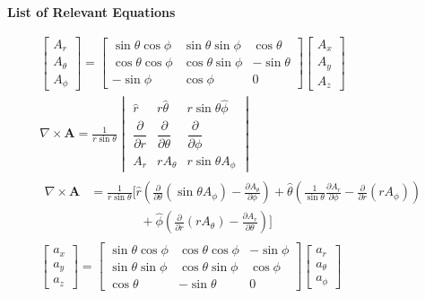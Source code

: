 \begin{center}
    \textbf{\large List of Relevant Equations}
\end{center}

\begin{gather*}
\begin{bmatrix}
A_r \\
A_{\theta} \\
A_{\phi}
\end{bmatrix}
=
\begin{bmatrix}
\sin\theta \cos\phi & \sin\theta \sin\phi & \cos\theta \\
\cos\theta \cos\phi & \cos\theta \sin\phi & -\sin\theta \\
-\sin\phi & \cos\phi & 0
\end{bmatrix}
\begin{bmatrix}
A_x \\
A_y \\
A_z
\end{bmatrix} \\[1.8em]
\nabla \times \mathbf{A}
=
\frac{1}{r \sin\theta}
\begin{vmatrix}
\hat{r} & r \hat{\theta} & r \sin\theta \hat{\phi} \\[0.4em]
\dfrac{\partial}{\partial r} & \dfrac{\partial}{\partial \theta} & \dfrac{\partial}{\partial \phi} \\[0.6em]
A_r & r A_\theta & r \sin\theta A_\phi
\end{vmatrix} \\[1.8em]
\begin{aligned}
\nabla \times \mathbf{A}
&= \frac{1}{r \sin\theta} \Bigg[
  \hat{r} \left(
    \frac{\partial}{\partial \theta}(\sin\theta A_\phi) - \frac{\partial A_\theta}{\partial \phi}
  \right)
  + \hat{\theta} \left(
    \frac{1}{\sin\theta}\frac{\partial A_r}{\partial \phi} - \frac{\partial}{\partial r}(r A_\phi)
  \right) \\
&\qquad\qquad
  + \hat{\phi} \left(
    \frac{\partial}{\partial r}(r A_\theta) - \frac{\partial A_r}{\partial \theta}
  \right)
\Bigg]
\end{aligned} \\[1.8em]
\begin{bmatrix}
a_x \\
a_y \\
a_z
\end{bmatrix}
=
\begin{bmatrix}
\sin\theta \cos\phi & \cos\theta \cos\phi & -\sin\phi \\
\sin\theta \sin\phi & \cos\theta \sin\phi & \cos\phi \\
\cos\theta           & -\sin\theta          & 0
\end{bmatrix}
\begin{bmatrix}
a_r \\
a_{\theta} \\
a_{\phi}
\end{bmatrix}
\end{gather*}